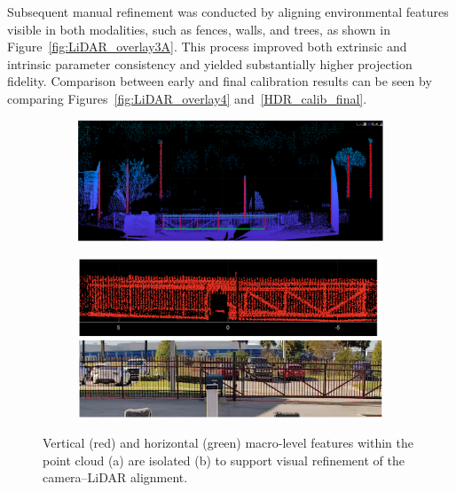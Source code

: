 \documentclass[../main.tex]{subfiles}
\begin{document}
Subsequent manual refinement was conducted by aligning environmental features visible in both modalities, such as fences, walls, and trees, as shown in Figure~\ref{fig:LiDAR_overlay3A}.  
This process improved both extrinsic and intrinsic parameter consistency and yielded substantially higher projection fidelity.  
Comparison between early and final calibration results can be seen by comparing Figures~\ref{fig:LiDAR_overlay4} and~\ref{HDR_calib_final}.

\begin{figure}[htp]
\begin{subfigure}{\textwidth}
\centering
\includegraphics[width=0.94\linewidth]{Images/LiDAR_features.png}
    \caption{}
\end{subfigure}
\bigskip
\begin{subfigure}{\textwidth}
\centering
\includegraphics[width=0.94\linewidth]{Images/LiDAR_calib_fence.png}
    \caption{}
\end{subfigure}
\caption{Vertical (red) and horizontal (green) macro-level features within the point cloud (a) are isolated (b) to support visual refinement of the camera–LiDAR alignment.}
\end{figure}
\end{document}
